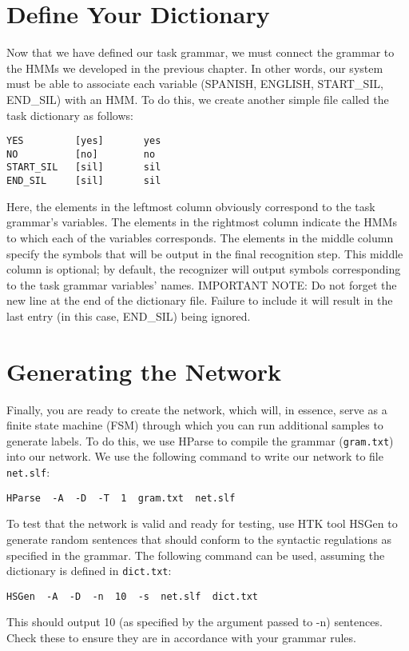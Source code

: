 \documentclass{wileySev}
\begin{document}
\section{Define Your Dictionary}
Now that we have defined our task grammar, we must connect the grammar to the HMMs we developed in the previous chapter. In other words, our system must be able to associate each variable (SPANISH, ENGLISH, START\_SIL, END\_SIL) with an HMM. To do this, we create another simple file called the task dictionary as follows:
\begin{verbatim}
YES			[yes]		yes
NO			[no]		no
START_SIL	[sil]		sil
END_SIL		[sil]		sil
\end{verbatim}
Here, the elements in the leftmost column obviously correspond to the task grammar's variables. The elements in the rightmost column indicate the HMMs to which each of the variables corresponds. The elements in the middle column specify the symbols that will be output in the final recognition step. This middle column is optional; by default, the recognizer will output symbols corresponding to the task grammar variables' names.
IMPORTANT NOTE: Do not forget the new line at the end of the dictionary file. Failure to include it will result in the last entry (in this case, END\_SIL) being ignored.
\section{Generating the Network}
Finally, you are ready to create the network, which will, in essence, serve as a finite state machine (FSM) through which you can run additional samples to generate labels. To do this, we use HParse to compile the grammar (\texttt{gram.txt}) into our network. We use the following command to write our network to file \texttt{net.slf}:
\begin{verbatim}
HParse  -A  -D  -T  1  gram.txt  net.slf
\end{verbatim}
To test that the network is valid and ready for testing, use HTK tool HSGen to generate random sentences that should conform to the syntactic regulations as specified in the grammar. The following command can be used, assuming the dictionary is defined in \texttt{dict.txt}:
\begin{verbatim}
HSGen  -A  -D  -n  10  -s  net.slf  dict.txt
\end{verbatim}
This should output 10 (as specified by the argument passed to -n) sentences. Check these to ensure they are in accordance with your grammar rules.
\end{document}
